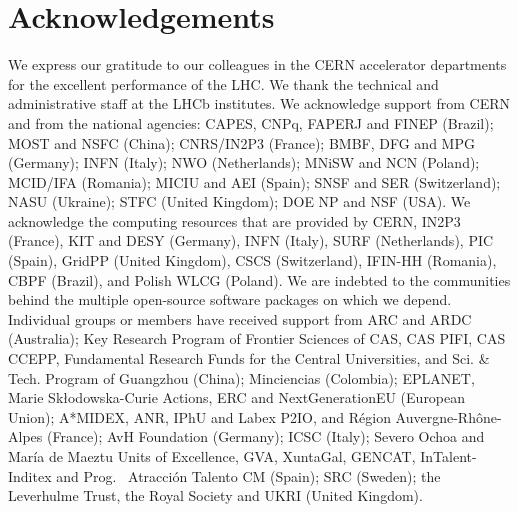 \documentclass[12pt,a4paper]{article}
\begin{document}
\section*{Acknowledgements}
\noindent We express our gratitude to our colleagues in the CERN
accelerator departments for the excellent performance of the LHC. We
thank the technical and administrative staff at the LHCb
institutes.
We acknowledge support from CERN and from the national agencies:
CAPES, CNPq, FAPERJ and FINEP (Brazil); 
MOST and NSFC (China); 
CNRS/IN2P3 (France); 
BMBF, DFG and MPG (Germany); 
INFN (Italy); 
NWO (Netherlands); 
MNiSW and NCN (Poland); 
MCID/IFA (Romania); 
MICIU and AEI (Spain);
SNSF and SER (Switzerland); 
NASU (Ukraine); 
STFC (United Kingdom); 
DOE NP and NSF (USA).
We acknowledge the computing resources that are provided by CERN, IN2P3
(France), KIT and DESY (Germany), INFN (Italy), SURF (Netherlands),
PIC (Spain), GridPP (United Kingdom), 
CSCS (Switzerland), IFIN-HH (Romania), CBPF (Brazil),
and Polish WLCG (Poland).
We are indebted to the communities behind the multiple open-source
software packages on which we depend.
Individual groups or members have received support from
ARC and ARDC (Australia);
Key Research Program of Frontier Sciences of CAS, CAS PIFI, CAS CCEPP, 
Fundamental Research Funds for the Central Universities, 
and Sci. \& Tech. Program of Guangzhou (China);
Minciencias (Colombia);
EPLANET, Marie Sk\l{}odowska-Curie Actions, ERC and NextGenerationEU (European Union);
A*MIDEX, ANR, IPhU and Labex P2IO, and R\'{e}gion Auvergne-Rh\^{o}ne-Alpes (France);
AvH Foundation (Germany);
ICSC (Italy); 
Severo Ochoa and Mar\'ia de Maeztu Units of Excellence, GVA, XuntaGal, GENCAT, InTalent-Inditex and Prog. ~Atracci\'on Talento CM (Spain);
SRC (Sweden);
the Leverhulme Trust, the Royal Society
 and UKRI (United Kingdom).

 
\newpage







 
\end{document}
